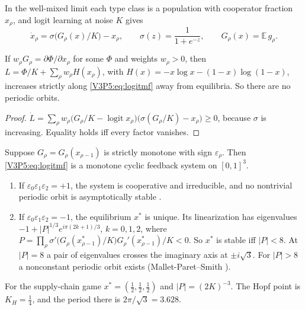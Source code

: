 In the well-mixed limit each type class is a population with cooperator fraction $x_\rho$, and
logit learning at noise $K$ gives
\begin{equation}\label{V3P5:eq:logitmf}
\dot x_\rho=\sigma\bigl(G_\rho(x)/K\bigr)-x_\rho,\qquad \sigma(z)=\frac1{1+e^{-z}},\qquad
G_\rho(x)=\mathbb E\,g_\rho .
\end{equation}

\begin{proposition}\label{V3P5:prop:lyap}
If $w_\rho G_\rho=\partial\Phi/\partial x_\rho$ for some $\Phi$ and weights $w_\rho>0$, then
$L=\Phi/K+\sum_\rho w_\rho H(x_\rho)$, with $H(x)=-x\log x-(1-x)\log(1-x)$, increases strictly
along \eqref{V3P5:eq:logitmf} away from equilibria. So there are no periodic orbits.
\end{proposition}

\begin{proof}
$\dot L=\sum_\rho w_\rho\bigl(G_\rho/K-\operatorname{logit}x_\rho\bigr)\bigl(\sigma(G_\rho/K)-x_\rho\bigr)\ge0$,
because $\sigma$ is increasing. Equality holds iff every factor vanishes.
\end{proof}

\begin{theorem}\label{V3P5:thm:cycle}
Suppose $G_\rho=G_\rho(x_{\rho-1})$ is strictly monotone with sign $\varepsilon_\rho$. Then
\eqref{V3P5:eq:logitmf} is a monotone cyclic feedback system on $[0,1]^{3}$.
\begin{enumerate}
\item[(i)] If $\varepsilon_0\varepsilon_1\varepsilon_2=+1$, the system is cooperative and
irreducible, and no nontrivial periodic orbit is asymptotically stable \cite{Smith95}.
\item[(ii)] If $\varepsilon_0\varepsilon_1\varepsilon_2=-1$, the equilibrium $x^{*}$ is unique.
Its linearization has eigenvalues $-1+|P|^{1/3}e^{i\pi(2k+1)/3}$, $k=0,1,2$, where
$P=\prod_\rho\sigma'\bigl(G_\rho(x^{*}_{\rho-1})/K\bigr)G_\rho'(x^{*}_{\rho-1})/K<0$. So $x^{*}$
is stable iff $|P|<8$. At $|P|=8$ a pair of eigenvalues crosses the imaginary axis at $\pm
i\sqrt3$. For $|P|>8$ a nonconstant periodic orbit exists (Mallet-Paret--Smith
\cite{MPS90}).
\end{enumerate}
For the supply-chain game $x^{*}=(\frac12,\frac12,\frac12)$ and $|P|=(2K)^{-3}$. The Hopf point is
$K_H=\frac14$, and the period there is $2\pi/\sqrt3=3.628$.
\end{theorem}

